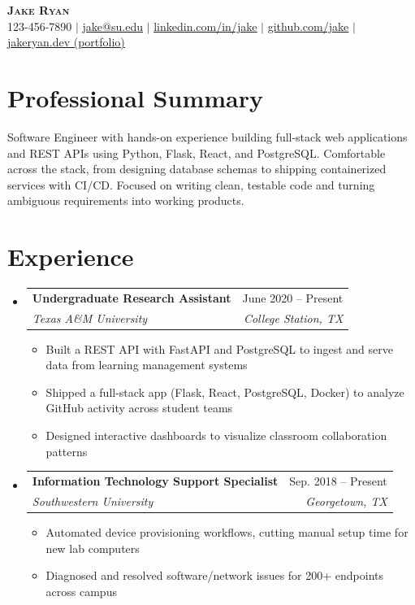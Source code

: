 \documentclass[letterpaper,11pt]{article}
\makeatletter
\newcommand{\resumeItem}[1]{
  \item\small{
    {#1 \vspace{-2pt}}
  }
}
\newcommand{\resumeSubheading}[4]{
  \vspace{-2pt}\item
    \begin{tabular*}{0.97\textwidth}[t]{l@{\extracolsep{\fill}}r}
      \textbf{#1} & #2 \\
      \textit{\small#3} & \textit{\small #4} \\
    \end{tabular*}\vspace{-7pt}
}
\newcommand{\resumeSubHeadingListStart}{\begin{itemize}[leftmargin=0.15in, label={}]}
\newcommand{\resumeSubHeadingListEnd}{\end{itemize}}
\newcommand{\resumeItemListStart}{\begin{itemize}}
\newcommand{\resumeItemListEnd}{\end{itemize}\vspace{-5pt}}
\makeatother
\begin{document}
\begin{center}
    \textbf{\Huge \scshape Jake Ryan} \\ \vspace{4pt}
    \small 123-456-7890 $|$ \href{mailto:x@x.com}{\underline{jake@su.edu}} $|$
    \href{https://linkedin.com/in/...}{\underline{linkedin.com/in/jake}} $|$
    \href{https://github.com/...}{\underline{github.com/jake}} $|$
    \href{https://jakeryan.dev}{\underline{jakeryan.dev (portfolio)}}
\end{center}

\section{Professional Summary}
\small{Software Engineer with hands-on experience building full-stack web applications and REST APIs using Python, Flask, React, and PostgreSQL. Comfortable across the stack, from designing database schemas to shipping containerized services with CI/CD. Focused on writing clean, testable code and turning ambiguous requirements into working products.}

\section{Experience}
  \resumeSubHeadingListStart

    \resumeSubheading
      {Undergraduate Research Assistant}{June 2020 -- Present}
      {Texas A\&M University}{College Station, TX}
      \resumeItemListStart
        \resumeItem{Built a REST API with FastAPI and PostgreSQL to ingest and serve data from learning management systems}
        \resumeItem{Shipped a full-stack app (Flask, React, PostgreSQL, Docker) to analyze GitHub activity across student teams}
        \resumeItem{Designed interactive dashboards to visualize classroom collaboration patterns}
      \resumeItemListEnd

    \resumeSubheading
      {Information Technology Support Specialist}{Sep. 2018 -- Present}
      {Southwestern University}{Georgetown, TX}
      \resumeItemListStart
        \resumeItem{Automated device provisioning workflows, cutting manual setup time for new lab computers}
        \resumeItem{Diagnosed and resolved software/network issues for 200+ endpoints across campus}
      \resumeItemListEnd

  \resumeSubHeadingListEnd
\end{document}
